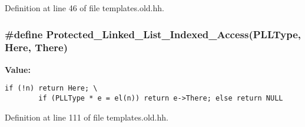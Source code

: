 Definition at line 46 of file templates.old.hh.
\subsubsection{\setlength{\rightskip}{0pt plus 5cm}\#define Protected\_\-Linked\_\-List\_\-Indexed\_\-Access({\bf PLLType}, Here, There)}\label{templates_8old_8hh_a4}


{\bf Value:}

\footnotesize\begin{verbatim}if (!n) return Here; \
        if (PLLType * e = el(n)) return e->There; else return NULL\end{verbatim}\normalsize 


Definition at line 111 of file templates.old.hh.
